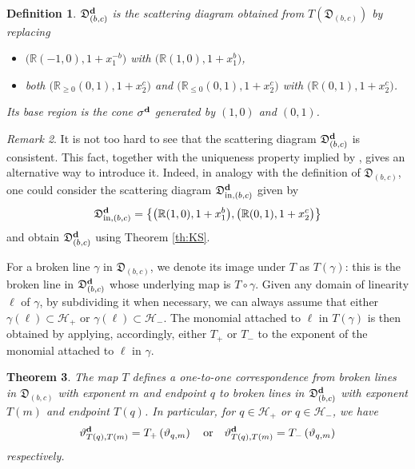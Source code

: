 \documentclass[11pt]{amsart}
\newtheorem{theorem}{Theorem}[section]
\newtheorem{defn}[theorem]{Definition}
\theoremstyle{remark}
\newtheorem{remark}[theorem]{Remark}
\numberwithin{equation}{section}
\newcommand{\RR}{\mathbb{R}}
\newcommand{\fD}{\mathfrak{D}}
\newcommand{\bfd}{{\bf d}}
\begin{document}
\begin{defn}
  $\fD_{(b,c)}^\bfd$ is the scattering diagram obtained from
  $T\left(\fD_{(b,c)}\right)$ by replacing 
  \begin{itemize}
    \item
      $\big(\RR (-1,0), 1+x_1^{-b}\big)$ with $\big(\RR  (1,0), 1+x_1^b\big)$,
    \item 
      both $ \big( \RR_{\ge0} (0,1), 1+x_2^c\big)$ and $\big( \RR_{\le0} (0,1),
      1+x_2^c\big)$ with $ \big( \RR (0,1), 1+x_2^c\big)$.
  \end{itemize}
  Its base region is the cone $\sigma^\bfd$ generated by $(1,0)$ and $(0,1)$.
\end{defn}

\begin{remark}
  It is not too hard to see that the scattering diagram $\fD_{(b,c)}^\bfd$ is
  consistent. This fact, together with the uniqueness property implied by
  \cite[Theorem 1.7]{GHKK}, gives an alternative way to introduce it. Indeed, in
  analogy with the definition of $\fD_{(b,c)}$, one could consider the
  scattering diagram
  $\fD_{\mathrm{in},(b,c)}^\bfd$ given by 
  \[
    \fD_{\mathrm{in},(b,c)}^\bfd=
    \left\{
      \big(\RR (1,0), 1+x_1^b\big), 
      \big(\RR (0,1), 1+x_2^c\big)
    \right\}
  \]
  and obtain $\fD_{(b,c)}^\bfd$ using Theorem \ref{th:KS}. 
\end{remark}

For a broken line $\gamma$ in $\fD_{(b,c)}$, we denote its image under $T$ as
$T(\gamma)$: this is the broken line in $\fD_{(b,c)}^\bfd$ whose underlying map
is $T\circ\gamma$. Given any domain of linearity $\ell$ of $\gamma$, by
subdividing it when necessary, we can always assume that either $\gamma(\ell)
\subset \mathcal{H}_{+} $ or $\gamma(\ell)\subset \mathcal{H}_{-}$. The monomial
attached to $\ell$ in $T(\gamma)$ is then obtained by applying, accordingly, either
$T_+$ or $T_-$ to the exponent of the monomial attached to $\ell$ in $\gamma$.

\begin{theorem}
  \label{thm:T_on_broken_lines}
  The map $T$ defines a one-to-one correspondence from broken lines in $\fD_{(b,c)}$
  with exponent $m$ and endpoint $q$ to broken lines in $\fD_{(b,c)}^\bfd$ with exponent $T(m)$
  and endpoint $T(q)$. In particular, for $q\in\mathcal{H}_+$ or $q\in\mathcal{H}_-$,
  we have
  \[ 
    \vartheta^\bfd_{T(q),T(m)}=T_{+} \left(\vartheta_{q,m}\right) 
    \quad
    \mbox{or} 
    \quad
    \vartheta^\bfd_{T(q),T(m)}=T_{-}\left(\vartheta_{q,m}\right)
  \]
  respectively.
\end{theorem}
\end{document}
